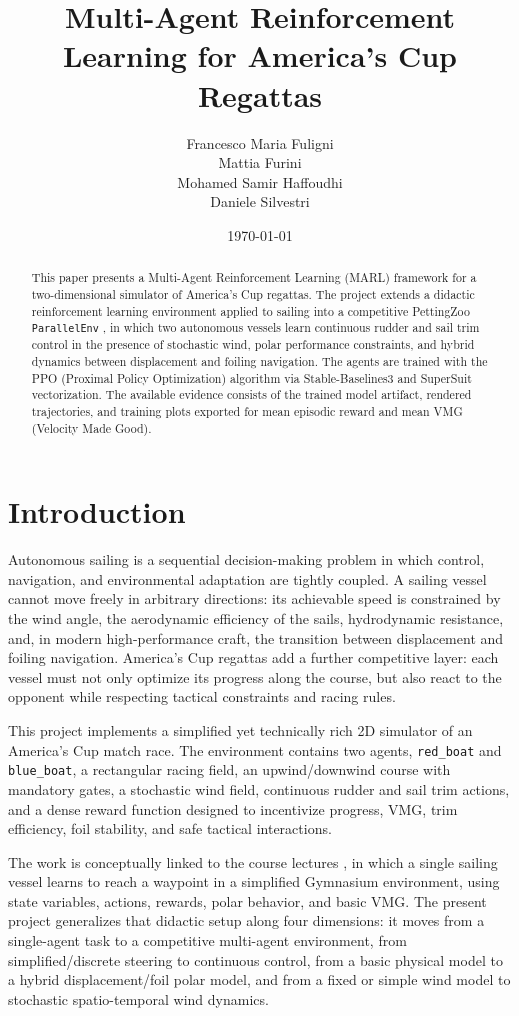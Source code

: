 \documentclass{article}
\title{Multi-Agent Reinforcement Learning for America's Cup Regattas}
\author{Francesco Maria Fuligni\\
Mattia Furini\\
Mohamed Samir Haffoudhi\\
Daniele Silvestri}
\date{\today}
\begin{document}
\maketitle

\begin{abstract}
This paper presents a Multi-Agent Reinforcement Learning (MARL) framework for a two-dimensional simulator of America's Cup regattas. The project extends a didactic reinforcement learning environment applied to sailing \cite{course_notes} into a competitive PettingZoo \texttt{ParallelEnv} \cite{pettingzoo}, in which two autonomous vessels learn continuous rudder and sail trim control in the presence of stochastic wind, polar performance constraints, and hybrid dynamics between displacement and foiling navigation. The agents are trained with the PPO (Proximal Policy Optimization) algorithm \cite{ppo} via Stable-Baselines3 \cite{sb3} and SuperSuit vectorization. The available evidence consists of the trained model artifact, rendered trajectories, and training plots exported for mean episodic reward and mean VMG (Velocity Made Good).
\end{abstract}

\section{Introduction}
Autonomous sailing is a sequential decision-making problem in which control, navigation, and environmental adaptation are tightly coupled. A sailing vessel cannot move freely in arbitrary directions: its achievable speed is constrained by the wind angle, the aerodynamic efficiency of the sails, hydrodynamic resistance, and, in modern high-performance craft, the transition between displacement and foiling navigation. America's Cup regattas add a further competitive layer: each vessel must not only optimize its progress along the course, but also react to the opponent while respecting tactical constraints and racing rules.

This project implements a simplified yet technically rich 2D simulator of an America's Cup match race. The environment contains two agents, \texttt{red\_boat} and \texttt{blue\_boat}, a rectangular racing field, an upwind/downwind course with mandatory gates, a stochastic wind field, continuous rudder and sail trim actions, and a dense reward function designed to incentivize progress, VMG, trim efficiency, foil stability, and safe tactical interactions.

The work is conceptually linked to the course lectures \cite{course_notes}, in which a single sailing vessel learns to reach a waypoint in a simplified Gymnasium environment, using state variables, actions, rewards, polar behavior, and basic VMG. The present project generalizes that didactic setup along four dimensions: it moves from a single-agent task to a competitive multi-agent environment, from simplified/discrete steering to continuous control, from a basic physical model to a hybrid displacement/foil polar model, and from a fixed or simple wind model to stochastic spatio-temporal wind dynamics.
\end{document}
